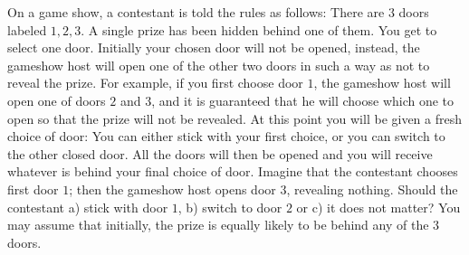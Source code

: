 \begin{example}
	On a game show, a contestant is told the rules as follows: There are $3$ doors labeled $1,2,3$. A single prize has been hidden behind one of them. You get to select one door. Initially your chosen door will not be opened, instead, the gameshow host will open one of the other two doors in such a way as not to reveal the prize. For example, if you first choose door $1$, the gameshow host will open one of doors $2$ and $3$, and it is guaranteed that he will choose which one to open so that the prize will not be revealed. At this point you will be given a fresh choice of door: You can either stick with your first choice, or you can switch to the other closed door. All the doors will then be opened and you will receive whatever is behind your final choice of door.\newline
	Imagine that the contestant chooses first door $1$; then the gameshow host opens door $3$, revealing nothing. Should the contestant a) stick with door $1$, b) switch to door $2$ or c) it does not matter? You may assume that initially, the prize is equally likely to be behind any of the $3$ doors. \newline
	

\end{example}
